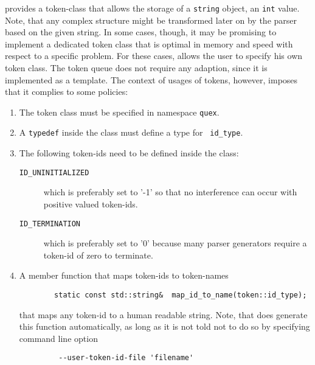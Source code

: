 {\Quex} provides a token-class that allows the storage of a {\tt string}
object, an {\tt int} value. Note, that any complex structure might be
transformed later on by the parser based on the given string. In some cases,
though, it may be promising to implement a dedicated token class that is
optimal in memory and speed with respect to a specific problem. For these
cases, {\quex} allows the user to specify his own token class. The token queue 
does not require any adaption, since it is implemented as a template. The 
context of usages of tokens, however, imposes that it complies to some policies:


\begin{enumerate}
  \item The token class must be specified in namespace {\tt quex}.
    
  \item A {\tt typedef} inside the class must define a type for {\tt
      id\_type}.

    \item The following token-ids need to be defined inside the class:
      \begin{description}
        \item[\tt ID\_UNINITIALIZED] which is preferably set to '-1' so that 
          no interference can occur with positive valued token-ids.
        \item[\tt ID\_TERMINATION] which is preferably set to '0' because many parser
          generators require a token-id of zero to terminate.
      \end{description}

    \item A member function that maps token-ids to token-names
      \begin{verbatim}
        static const std::string&  map_id_to_name(token::id_type);
      \end{verbatim}
      that maps any token-id to a human readable string. Note, that {\quex}
      does generate this function automatically, as long as it is not told not
      to do so by specifying command line option
        \begin{verbatim}
         --user-token-id-file 'filename'
        \end{verbatim}
      

\end{enumerate}
